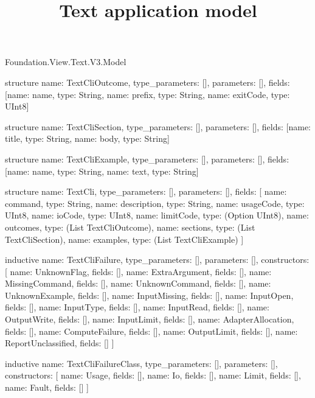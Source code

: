 \begin{lexlean}{Foundation.View.Text.V3.Model}
\title{Text application model}
\begin{semanticmodule}
structure{
  name: TextCliOutcome,
  type_parameters: [],
  parameters: [],
  fields: [{name: name, type: String}, {name: prefix, type: String}, {name: exitCode, type: UInt8}]
}

structure{
  name: TextCliSection,
  type_parameters: [],
  parameters: [],
  fields: [{name: title, type: String}, {name: body, type: String}]
}

structure{
  name: TextCliExample,
  type_parameters: [],
  parameters: [],
  fields: [{name: name, type: String}, {name: text, type: String}]
}

structure{
  name: TextCli,
  type_parameters: [],
  parameters: [],
  fields: [
    {name: command, type: String},
    {name: description, type: String},
    {name: usageCode, type: UInt8},
    {name: ioCode, type: UInt8},
    {name: limitCode, type: (Option UInt8)},
    {name: outcomes, type: (List TextCliOutcome)},
    {name: sections, type: (List TextCliSection)},
    {name: examples, type: (List TextCliExample)}
  ]
}

inductive{
  name: TextCliFailure,
  type_parameters: [],
  parameters: [],
  constructors: [
    {name: UnknownFlag, fields: []},
    {name: ExtraArgument, fields: []},
    {name: MissingCommand, fields: []},
    {name: UnknownCommand, fields: []},
    {name: UnknownExample, fields: []},
    {name: InputMissing, fields: []},
    {name: InputOpen, fields: []},
    {name: InputType, fields: []},
    {name: InputRead, fields: []},
    {name: OutputWrite, fields: []},
    {name: InputLimit, fields: []},
    {name: AdapterAllocation, fields: []},
    {name: ComputeFailure, fields: []},
    {name: OutputLimit, fields: []},
    {name: ReportUnclassified, fields: []}
  ]
}

inductive{
  name: TextCliFailureClass,
  type_parameters: [],
  parameters: [],
  constructors: [
    {name: Usage, fields: []},
    {name: Io, fields: []},
    {name: Limit, fields: []},
    {name: Fault, fields: []}
  ]
}


\end{semanticmodule}
\end{lexlean}
